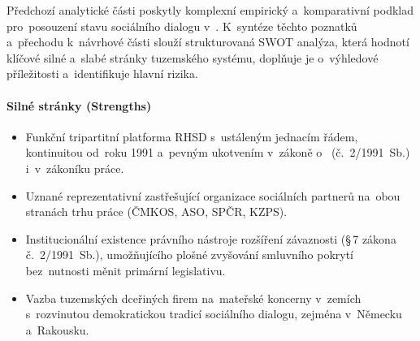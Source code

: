 
Předchozí analytické části poskytly komplexní empirický a~komparativní podklad pro~posouzení stavu sociálního dialogu v~. K~syntéze těchto poznatků a~přechodu k~návrhové části slouží strukturovaná SWOT analýza, která hodnotí klíčové silné a~slabé stránky tuzemského systému, doplňuje je o~výhledové příležitosti a~identifikuje hlavní rizika.\par

\paragraph{Silné stránky (Strengths)}\label{par:swot_s}
\begin{itemize}[noitemsep]
	\item Funkční tripartitní platforma \acs{RHSD} s~ustáleným jednacím řádem, kontinuitou od~roku 1991 a~pevným ukotvením v~zákoně o~ (č.~2/1991~Sb.) i~v~zákoníku práce.
	\item Uznané reprezentativní zastřešující organizace sociálních partnerů na~obou stranách trhu práce (\acs{ČMKOS}, \acs{ASO}, \acs{SPČR}, \acs{KZPS}).
	\item Institucionální existence právního nástroje rozšíření závaznosti  (\mbox{§\,7} zákona č.~2/1991~Sb.), umožňujícího plošné zvyšování smluvního pokrytí bez~nutnosti měnit primární legislativu.
	\item Vazba tuzemských dceřiných firem na~mateřské koncerny v~zemích s~rozvinutou demokratickou tradicí sociálního dialogu, zejména v~Německu a~Rakousku.
\end{itemize}

